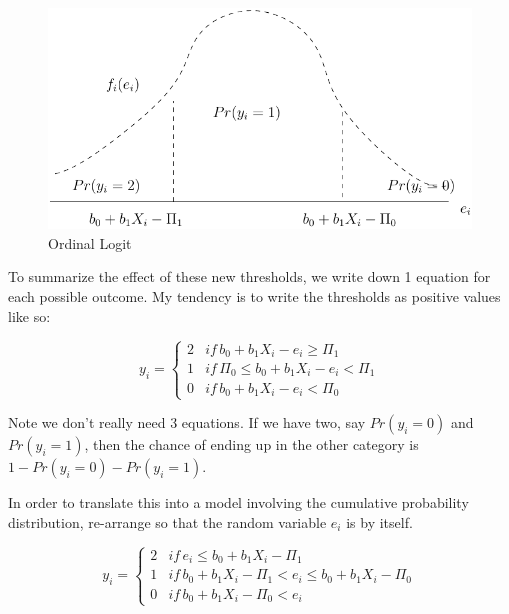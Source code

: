 \begin{figure}
\begin{centering}
\includegraphics{Chapter1/cumulative2}
\par\end{centering}

\caption{Ordinal Logit\label{cap:Ordinal-Logit}}
\end{figure}


To summarize the effect of these new thresholds, we write down 1 equation
for each possible outcome. My tendency is to write the thresholds
as positive values like so:

\begin{equation}
y_{i}=\left\{ \begin{array}{lll}
2 & if\, b_{0}+b_{1}X_{i}-e_{i}\geq\Pi_{1}\\
1 & if\,\Pi_{0}\leq b_{0}+b_{1}X_{i}-e_{i}<\Pi_{1}\\
0 & if\, b_{0}+b_{1}X_{i}-e_{i}<\Pi_{0}
\end{array}\right.\label{eq:3category1}
\end{equation}


Note we don't really need 3 equations. If we have two, say $Pr(y_{i}=0)$
and $Pr(y_{i}=1)$, then the chance of ending up in the other category
is $1-Pr(y_{i}=0)-Pr(y_{i}=1)$.

In order to translate this into a model involving the cumulative probability
distribution, re-arrange so that the random variable $e_{i}$ is by
itself.

\begin{equation}
y_{i}=\left\{ \begin{array}{lll}
2 & if\, e_{i}\leq b_{0}+b_{1}X_{i}-\Pi_{1}\\
1 & if\, b_{0}+b_{1}X_{i}-\Pi_{1}<e_{i}\leq b_{0}+b_{1}X_{i}-\Pi_{0}\\
0 & if\, b_{0}+b_{1}X_{i}-\Pi_{0}<e_{i}
\end{array}\right.\label{eq:3category2-1}
\end{equation}



